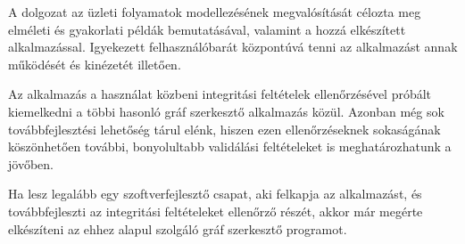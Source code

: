 
A dolgozat az üzleti folyamatok modellezésének megvalósítását célozta meg elméleti és gyakorlati példák bemutatásával, valamint a hozzá elkészített alkalmazással. Igyekezett felhasználóbarát központúvá tenni az alkalmazást annak működését és kinézetét illetően.

Az alkalmazás a használat közbeni integritási feltételek ellenőrzésével próbált kiemelkedni a többi hasonló gráf szerkesztő alkalmazás közül. Azonban még sok továbbfejlesztési lehetőség tárul elénk, hiszen ezen ellenőrzéseknek sokaságának köszönhetően további, bonyolultabb validálási feltételeket is meghatározhatunk a jövőben.

Ha lesz legalább egy szoftverfejlesztő csapat, aki felkapja az alkalmazást, és továbbfejleszti az integritási feltételeket ellenőrző részét, akkor már megérte elkészíteni az ehhez alapul szolgáló gráf szerkesztő programot.